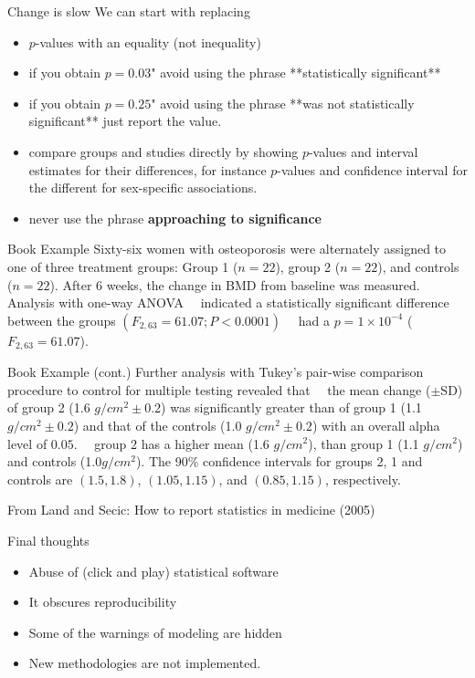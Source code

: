 \documentclass{beamer}
\begin{document}
\begin{frame}{Change is slow}
We can start with replacing

\begin{itemize}
	\item $p$-values with an equality (not inequality)
	\item  if you obtain $p=0.03$" avoid using the phrase **statistically significant**
	\item  if you obtain $p=0.25$" avoid using the phrase **was not statistically significant** just report the value.
	\item  compare groups and studies directly by showing $p$-values and interval estimates for their differences, for instance $p$-values and confidence interval for the different for sex-specific associations. 
	\item never use the phrase \textbf{approaching to significance} 
\end{itemize}

\end{frame}

\begin{frame}{Book Example}
Sixty-six women with osteoporosis were alternately assigned to one of three treatment groups: Group 1 ($n=22$), group 2 ($n=22$), and controls ($n=22$). After 6 weeks, the change in BMD from baseline was measured. Analysis with one-way ANOVA ~~indicated a statistically significant difference between the groups $(F_{2,63}=61.07;P<0.0001)$~~ had a $p=1\times 10^{-4}$ ($F_{2,63}=61.07$).
\end{frame}


\begin{frame}{Book Example (cont.)}
Further analysis with Tukey's pair-wise comparison procedure to control for multiple testing revealed that ~~the mean change (\( \pm \)SD) of group 2 (1.6 $g/cm^2 \pm 0.2$) was significantly greater than of group 1 (1.1 $g/cm^2\pm 0.2$) and that of the controls (1.0 $g/cm^2 \pm 0.2$) with an overall alpha level of $0.05$.~~ group 2 has a higher mean (1.6 $g/cm^2$), than group 1 (1.1 $g/cm^2$) and controls (1.0$g/cm^2$). The 90\% confidence intervals for groups 2, 1 and controls are $(1.5,1.8)$, $(1.05,1.15)$, and $(0.85,1.15)$, respectively.  

From Land and Secic: How to report statistics in medicine (2005)
	
\end{frame}

\begin{frame}{Final thoughts}
\begin{itemize}
	\item Abuse of (click and play) statistical software 
	\item It obscures reproducibility
	\item Some of the warnings of modeling are hidden
	\item New methodologies are not implemented.
\end{itemize}	
	
	
\end{frame}
\end{document}
